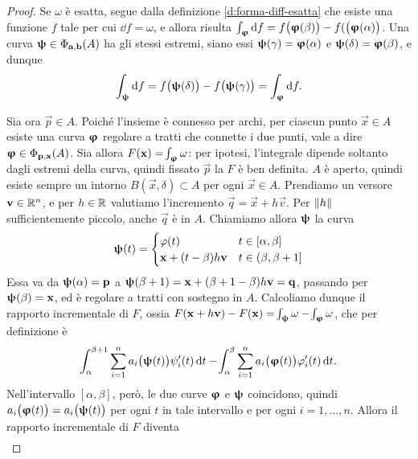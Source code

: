 \begin{proof}
	Se $\omega$ è esatta, segue dalla definizione \ref{d:forma-diff-esatta} che esiste una funzione $f$ tale per cui $\dd f=\omega$, e allora risulta $\int_{\bm{\upvarphi}}\textup{d} f=f\big(\bm{\upvarphi}(\beta)\big)-f(\big(\bm{\upvarphi}(\alpha)\big)$.
	Una curva $\bm{\uppsi}\in\Phi_{\mathbf{a},\mathbf{b}}(A)$ ha gli stessi estremi, siano essi $\bm{\uppsi}(\gamma)=\bm{\upvarphi}(\alpha)$ e $\bm{\uppsi}(\delta)=\bm{\upvarphi}(\beta)$, e dunque
	\begin{equation}
		\int_{\bm{\uppsi}}\textup{d} f=f\big(\bm{\uppsi}(\delta)\big)-f\big(\bm{\uppsi}(\gamma)\big)=\int_{\bm{\upvarphi}}\textup{d} f.
	\end{equation}
	
	Sia ora $\vec p\in A$. Poiché l'insieme è connesso per archi, per ciascun punto $\vec x\in A$ esiste una curva $\bm{\upvarphi}$ regolare a tratti che connette i due punti, vale a dire $\bm{\upvarphi}\in\Phi_{\mathbf{p},\mathbf{x}}(A)$.
	Sia allora $F(\mathbf{x})=\!\int_{\bm{\upvarphi}}\omega$: per ipotesi, l'integrale dipende soltanto dagli estremi della curva, quindi fissato $\vec p$ la $F$ è ben definita. $A$ è aperto, quindi esiste sempre un intorno $B(\vec x,\delta)\subset A$ per ogni $\vec x\in A$.
	Prendiamo un versore $\mathbf{v}\in\mathbb{R}^n$, e per $h\in\mathbb{R}$ valutiamo l'incremento $\vec q=\vec x+h\vec v$.
	Per $\left\|{h}\right\|$ sufficientemente piccolo, anche $\vec q$ è in $A$. Chiamiamo allora $\bm{\uppsi}$ la curva
	\begin{equation*}
		\bm{\uppsi}(t)=
		\begin{cases}
			\varphi(t)	&t\in[\alpha,\beta]\\
			\mathbf{x}+(t-\beta)h\mathbf{v}	&t\in(\beta,\beta+1]
		\end{cases}
	\end{equation*}
	Essa va da $\bm{\uppsi}(\alpha)=\mathbf{p}$ a $\bm{\uppsi}(\beta+1)=\mathbf{x}+(\beta+1-\beta)h\mathbf{v}=\mathbf{q}$, passando per $\bm{\uppsi}(\beta)=\mathbf{x}$, ed è regolare a tratti con sostegno in $A$.
	Calcoliamo dunque il rapporto incrementale di $F$, ossia $F(\mathbf{x}+h\mathbf{v})-F(\mathbf{x})=\!\int_{\bm{\uppsi}}\omega-\!\int_{\bm{\upvarphi}}\omega$, che per definizione è
	\begin{equation}
		\!\int_\alpha^{\beta+1}\sum_{i=1}^na_i\big(\bm{\uppsi}(t)\big)\psi_i'(t)\,\textup{d} t-\!\int_\alpha^\beta\sum_{i=1}^na_i\big(\bm{\upvarphi}(t)\big)\varphi_i'(t)\,\textup{d} t.
	\end{equation}
	Nell'intervallo $[\alpha,\beta]$, però, le due curve $\bm{\upvarphi}$ e $\bm{\uppsi}$ coincidono, quindi $a_i\big(\bm{\upvarphi}(t)\big)=a_i\big(\bm{\uppsi}(t)\big)$ per ogni $t$ in tale intervallo e per ogni $i=1,\dots,n$.
	Allora il rapporto incrementale di $F$ diventa
	\begin{equation}
		\begin{aligned}

\end{aligned}
\end{equation}
\end{proof}
